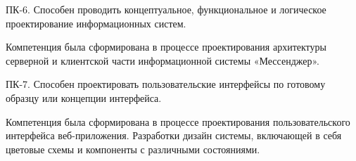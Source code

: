 ПК-6. Способен проводить концептуальное, функциональное и логическое проектирование информационных систем.

Компетенция была сформирована в процессе проектирования архитектуры серверной и клиентской части информационной системы «Мессенджер».

ПК-7. Способен проектировать пользовательские интерфейсы по готовому образцу или концепции интерфейса.

Компетенция была сформирована в процессе проектирования пользовательского интерфейса веб-приложения. Разработки дизайн системы, включающей в себя цветовые схемы и компоненты с различными состояниями.
